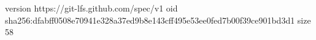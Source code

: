 version https://git-lfs.github.com/spec/v1
oid sha256:dfabff0508e70941e328a37ed9b8e143cff495e53ee0fed7b00f39ce901bd3d1
size 58
